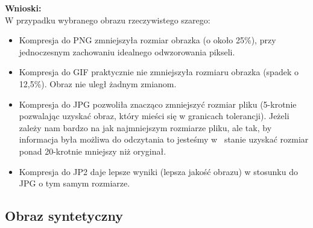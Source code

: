 \documentclass[a4paper, 12pt]{article}
\begin{document}
\textbf{Wnioski:} \\
W przypadku wybranego obrazu rzeczywistego szarego:

\begin{itemize}
  \setlength\itemsep{-0.2cm}
    \item Kompresja do PNG zmniejszyła rozmiar obrazka (o około 25\%), przy jednoczesnym 
    zachowaniu idealnego odwzorowania pikseli. 
    \item Kompresja do GIF praktycznie nie zmniejszyła rozmiaru obrazka (spadek o 12,5\%).
    Obraz nie uległ żadnym zmianom.
     \item Kompresja do JPG pozwoliła znacząco zmniejszyć rozmiar pliku (5-krotnie
     pozwalając uzyskać obraz, który mieści się w granicach tolerancji). Jeżeli zależy nam bardzo
     na jak najmniejszym rozmiarze pliku, ale tak, by informacja była możliwa do odczytania to jesteśmy 
     w~ stanie uzyskać rozmiar ponad 20-krotnie mniejszy niż oryginał.
     \item Kompresja do JP2 daje lepsze wyniki (lepsza jakość obrazu) w stosunku do JPG o tym samym rozmiarze.
  \end{itemize}

\subsection{Obraz syntetyczny}
\end{document}
